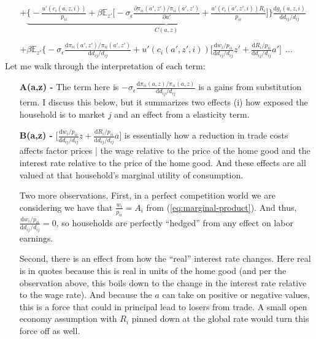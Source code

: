 \documentclass[12pt,pdftex]{article}
\begin{document}
\begin{onehalfspacing}
{\begin{align}
\nonumber \\
& + \underbrace{\bigg \{- \frac{u'(c_{i}(a,z,i))}{p_{ii}} + \beta \mathbb{E}_{z'} \bigg [-\sigma_{\epsilon} \frac{\partial \pi_{ii}(a',z') / \pi_{ii}(a',z')}{\partial a'} + \frac{u'(c_{i}(a',z',i))R_{i}}{p_{ii}} \bigg ] \bigg \}\frac{\mathrm{d} g_{i}(a,z,i)}{\mathrm{d} d_{ij} / d_{ij}}}_{C(a,z)} \\
\nonumber \\
& + \beta \mathbb{E}_{z'} \bigg \{ -\sigma_{\epsilon} \frac{\mathrm{d} \pi_{ii}(a',z') / \pi_{ii}(a',z')}{\mathrm{d}d_{ij} / d_{ij}} +  u'(c_{i}(a',z',i)) \bigg[ \frac{\mathrm{d} w_{i} / p_{ii}}{\mathrm{d} d_{ij} / d_{ij}}z'  +  \frac{\mathrm{d} R_{i} / p_{ii}}{\mathrm{d} d_{ij} / d_{ij}} a' \bigg] \ \  \ldots
\label{eq:apx-welfare-vterms}
\end{align}
}
Let me walk through the interpretation of each term:
\begin{itemize}
\item[\textbf{A(a,z) -}] The term here is $-\sigma_{\epsilon} \frac{\mathrm{d} \pi_{ii}(a,z) / \pi_{ii}(a,z)}{\mathrm{d}d_{ij} / d_{ij}}$ is a gains from substitution term. I discuss this below, but it summarizes two effects (i) how exposed the household is to market $j$ and an effect from a elasticity term.

\item[\textbf{B(a,z) -}] $\bigg[ \frac{\mathrm{d} w_{i} / p_{ii}}{\mathrm{d} d_{ij} / d_{ij}}z  +  \frac{\mathrm{d} R_{i} / p_{ii}}{\mathrm{d} d_{ij} / d_{ij}} a  \bigg]$ is essentially how a reduction in trade costs affects factor prices | the wage relative to the price of the home good and the interest rate relative to the price of the home good. And these effects are all valued at that household's marginal utility of consumption.
    
    Two more observations. First, in a perfect competition world we are considering we have that $\frac{w_i}{p_{ii}} = A_{i}$ from (\ref{eq:marginal-product}). And thus, $\frac{\mathrm{d} w_{i} / p_{ii}}{\mathrm{d} d_{ij} / d_{ij}} = 0$, so households are perfectly ``hedged'' from any effect on labor earnings.
    
    Second, there is an effect from how the ``real'' interest rate changes. Here real is in quotes because this is real in units of the home good (and per the observation above, this boils down to the change in the interest rate relative to the wage rate). And because the $a$ can take on positive or negative values, this is a force that could in principal lead to losers from trade. A small open economy assumption with $R_{i}$ pinned down at the global rate would turn this force off as well. 
    


\end{itemize}
\end{onehalfspacing}
\end{document}
